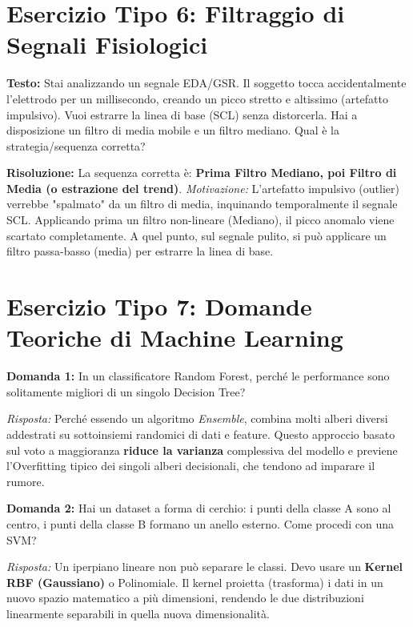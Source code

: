 \section{Esercizio Tipo 6: Filtraggio di Segnali Fisiologici}
\textbf{Testo:} Stai analizzando un segnale EDA/GSR. Il soggetto tocca accidentalmente l'elettrodo per un millisecondo, creando un picco stretto e altissimo (artefatto impulsivo).
Vuoi estrarre la linea di base (SCL) senza distorcerla.
Hai a disposizione un filtro di media mobile e un filtro mediano.
Qual è la strategia/sequenza corretta?

\vspace{0.5cm}
\textbf{Risoluzione:}
La sequenza corretta è: \textbf{Prima Filtro Mediano, poi Filtro di Media (o estrazione del trend)}.
\textit{Motivazione:} L'artefatto impulsivo (outlier) verrebbe "spalmato" da un filtro di media, inquinando temporalmente il segnale SCL.
Applicando prima un filtro non-lineare (Mediano), il picco anomalo viene scartato completamente.
A quel punto, sul segnale pulito, si può applicare un filtro passa-basso (media) per estrarre la linea di base.

\section{Esercizio Tipo 7: Domande Teoriche di Machine Learning}

\textbf{Domanda 1:} In un classificatore Random Forest, perché le performance sono solitamente migliori di un singolo Decision Tree?

\vspace{0.25cm}
\textit{Risposta:} Perché essendo un algoritmo \textit{Ensemble}, combina molti alberi diversi addestrati su sottoinsiemi randomici di dati e feature.
Questo approccio basato sul voto a maggioranza \textbf{riduce la varianza} complessiva del modello e previene l'Overfitting tipico dei singoli alberi decisionali, che tendono ad imparare il rumore.

\vspace{0.5cm}
\textbf{Domanda 2:} Hai un dataset a forma di cerchio: i punti della classe A sono al centro, i punti della classe B formano un anello esterno.
Come procedi con una SVM?

\vspace{0.25cm}
\textit{Risposta:} Un iperpiano lineare non può separare le classi.
Devo usare un \textbf{Kernel RBF (Gaussiano)} o Polinomiale.
Il kernel proietta (trasforma) i dati in un nuovo spazio matematico a più dimensioni, rendendo le due distribuzioni linearmente separabili in quella nuova dimensionalità.

